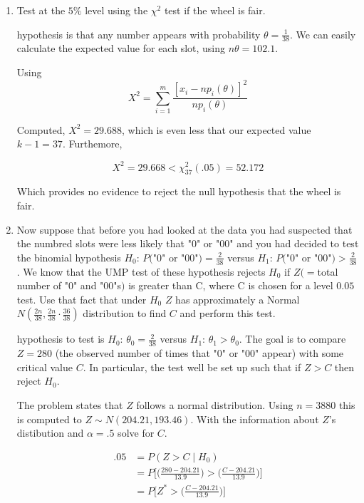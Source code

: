 \documentclass{tufte-book}
\theoremstyle{mytheoremstyle}
\theoremstyle{mylemstyle}
\theoremstyle{mydefstyle}
\begin{document}
\begin{enumerate}

\item Test at the $5\%$ level using the $\chi^2$ test if the wheel is fair.

 hypothesis is that any number appears with probability $\theta=\frac{1}{38}$.  We can easily calculate the expected value for each slot, using $n\theta=102.1$.

Using
\[ X^2 = \sum_{i=1}^m \frac{[x_i - np_i({\theta})]^2}{np_i({\theta})}\]

Computed, $X^2 = 29.688$, which is even less that our expected value $k-1=37$.  Furthemore,

\[X^2 = 29.668 < \chi^2_{37}(.05) = 52.172 \]

Which provides no evidence to reject the null hypothesis that the wheel is fair.

\item Now suppose that before you had looked at the data you had suspected that the numbred slots were less likely that "$0$" or "$00$" and you had decided to test the binomial hypothesis $H_0$: $P($"$0$" or "$00$"$)=\frac{2}{38}$ versus $H_1$: $P($"$0$" or "$00$"$) > \frac{2}{38}$.  We know that the UMP test of these hypothesis rejects $H_0$ if $Z(=$total number of "$0$" and "$00$"s$)$ is greater than C, where C is chosen for a level $0.05$ test.  Use that fact that under $H_0$ $Z$ has approximately a Normal $N(\frac{2n}{38},\frac{2n}{38}\cdot\frac{36}{38})$ distribution to find $C$ and perform this test.

 hypothesis to test is $H_0$: $\theta_0=\frac{2}{38}$ versus $H_1$: $\theta_1 > \theta_0$.  The goal is to compare $Z=280$ (the observed number of times that "0" or "00" appear) with some critical value $C$.  In particular, the test well be set up such that if $Z > C$ then reject $H_0$.

The problem states that $Z$ follows a normal distribution.  Using $n=3880$ this is computed to $Z \sim N(204.21, 193.46)$.  With the information about $Z$'s distibution and $\alpha=.5$ solve for $C$.

\begin{align*}
.05 &= P(Z > C \mid H_0) \\
&= P\big[ \Big(\frac{280-204.21}{13.9}\Big) > \Big(\frac{C-204.21}{13.9}\Big)\Big]\\
&= P\big[ Z^* > \Big(\frac{C-204.21}{13.9}\Big)\Big]\\
\end{align*}


\end{enumerate}
\end{document}
